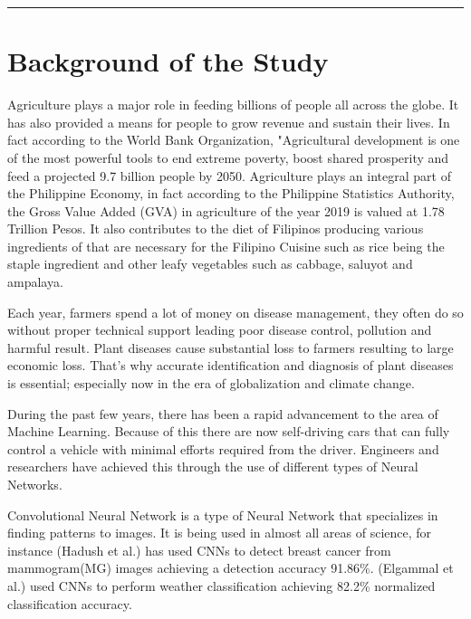 
\setlength{\headheight}{15pt}
\vspace{-1cm}\noindent\rule{\textwidth}{0.4pt}
\section{Background of the Study}

Agriculture plays a major role in feeding billions of people all
across the globe. It has also provided a means for people
to grow revenue and sustain their lives. In fact according to the 
World Bank Organization, "Agricultural development 
is one of the most powerful tools to end extreme poverty, 
boost shared prosperity and feed a projected 9.7 billion people by 2050.
Agriculture plays an integral 
part of the Philippine Economy, 
in fact according to the Philippine Statistics Authority, the Gross 
Value Added (GVA) in agriculture of the year 2019
is valued at 1.78 Trillion Pesos. 
It also contributes to the diet of Filipinos producing various 
ingredients of that are necessary for the Filipino Cuisine such as rice 
being the staple ingredient and other leafy vegetables such as cabbage,
saluyot and ampalaya.  

\bigskip


Each year, farmers spend a lot of money on disease management, they 
often do so without proper technical support leading poor disease 
control, pollution and harmful result. Plant diseases cause 
substantial loss to farmers resulting to large economic loss.
That's why accurate identification and diagnosis of plant diseases is 
essential; especially now in the era of globalization and climate 
change.

\bigskip

During the past few years, there has been a rapid advancement to the
area of Machine Learning. Because of this there are now self-driving cars 
that can fully control a vehicle with minimal efforts required from the
driver. Engineers and researchers have achieved this through the use 
of different types of Neural Networks. 

\bigskip

Convolutional Neural Network is a type of Neural Network that specializes 
in finding patterns to images. It is being used in almost all areas of science, 
for instance (Hadush et al.) has used CNNs to detect breast 
cancer from mammogram(MG) images achieving a detection accuracy 91.86\%. 
(Elgammal et al.) used CNNs to perform weather classification achieving 
82.2\% normalized classification accuracy.

